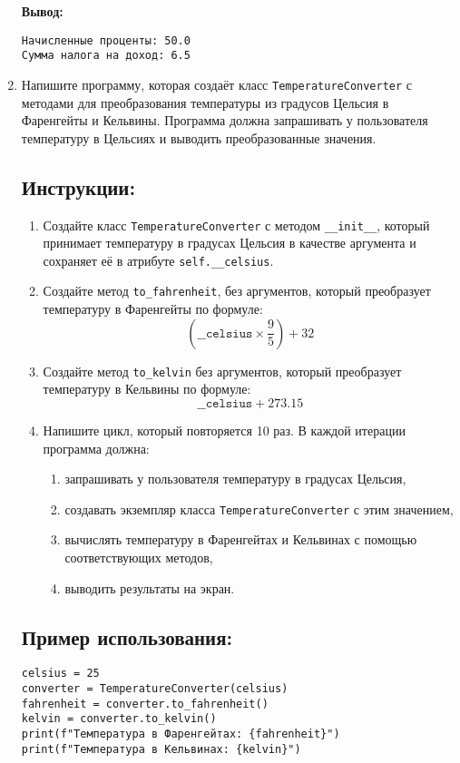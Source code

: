\begin{enumerate}
\textbf{Вывод:}
\begin{verbatim}
Начисленные проценты: 50.0
Сумма налога на доход: 6.5
\end{verbatim}

\item
Напишите программу, которая создаёт класс \texttt{TemperatureConverter} с методами для преобразования температуры
из градусов Цельсия в Фаренгейты и Кельвины. Программа должна запрашивать у пользователя температуру в Цельсиях
и выводить преобразованные значения.

\subsection*{Инструкции:}
\begin{enumerate}
\item Создайте класс \texttt{TemperatureConverter} с методом
\texttt{\_\_init\_\_}, который принимает температуру в градусах Цельсия в
качестве аргумента и сохраняет её в атрибуте \texttt{self.\_\_celsius}.

\item Создайте метод \texttt{to\_fahrenheit},
без аргументов, который преобразует температуру в Фаренгейты по формуле:
\[
(\texttt{\_\_celsius} \times \frac{9}{5}) + 32
\]

\item Создайте метод \texttt{to\_kelvin} без аргументов,
который преобразует температуру в Кельвины по формуле:
\[
\texttt{\_\_celsius} + 273.15
\]

\item Напишите цикл, который повторяется 10 раз. В каждой итерации программа должна:
\begin{enumerate}
\item запрашивать у пользователя температуру в градусах Цельсия,
\item создавать экземпляр класса \texttt{TemperatureConverter} с этим значением,
\item вычислять температуру в Фаренгейтах и Кельвинах с помощью соответствующих методов,
\item выводить результаты на экран.
\end{enumerate}
\end{enumerate}

\subsection*{Пример использования:}
\begin{verbatim}
celsius = 25
converter = TemperatureConverter(celsius)
fahrenheit = converter.to_fahrenheit()
kelvin = converter.to_kelvin()
print(f"Температура в Фаренгейтах: {fahrenheit}")
print(f"Температура в Кельвинах: {kelvin}")
\end{verbatim}


\end{enumerate}
